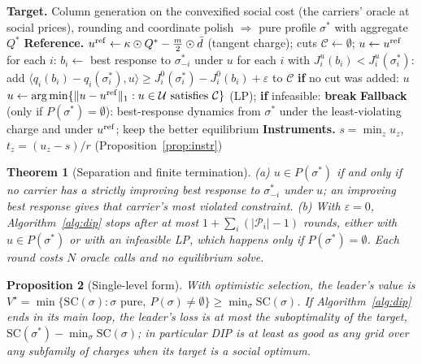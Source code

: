 \documentclass[preprint,12pt]{elsarticle}
\newtheorem{theorem}{Theorem}
\newtheorem{proposition}[theorem]{Proposition}
\theoremstyle{definition}
\theoremstyle{remark}
\newcommand{\ip}[2]{\langle #1,#2\rangle}
\begin{document}
\begin{algorithm}[t]
\caption{DIP: dual implementation pricing}\label{alg:dip}
\begin{algorithmic}[1]
\State \textbf{Target.} Column generation on the convexified social cost (the carriers' oracle at social prices), rounding and coordinate polish $\Rightarrow$ pure profile $\sigma^*$ with aggregate $Q^*$
\State \textbf{Reference.} $u^{\rm ref}\gets\kappa\odot Q^*-\tfrac m2\odot\bar d$ (tangent charge); cuts $\mathcal C\gets\emptyset$; $u\gets u^{\rm ref}$
\Repeat
  \State for each $i$: $b_i\gets$ best response to $\sigma^*_{-i}$ under $u$ 
  \State for each $i$ with $J^u_i(b_i)<J^u_i(\sigma^*_i)$: add $\ip{q_i(b_i)-q_i(\sigma^*_i)}{u}\ge J^0_i(\sigma^*_i)-J^0_i(b_i)+\varepsilon$ to $\mathcal C$
  \State \textbf{if} no cut was added: \Return $u$ 
  \State $u\gets\arg\min\{\|u-u^{\rm ref}\|_1:u\in\mathcal U\text{ satisfies }\mathcal C\}$ (LP); \textbf{if} infeasible: \textbf{break}
\Until{}
\State \textbf{Fallback} (only if $P(\sigma^*)=\emptyset$): best-response dynamics from $\sigma^*$ under the least-violating charge and under $u^{\rm ref}$; keep the better equilibrium
\State \textbf{Instruments.} $s=\min_zu_z$, $t_z=(u_z-s)/r$ (Proposition~\ref{prop:instr})
\end{algorithmic}
\end{algorithm}

\begin{theorem}[Separation and finite termination]\label{thm:cut}
(a) $u\in P(\sigma^*)$ if and only if no carrier has a strictly improving best response to $\sigma^*_{-i}$ under $u$; an improving best response gives that carrier's most violated constraint. (b) With $\varepsilon=0$, Algorithm~\ref{alg:dip} stops after at most $1+\sum_i(|\mathcal P_i|-1)$ rounds, either with $u\in P(\sigma^*)$ or with an infeasible LP, which happens only if $P(\sigma^*)=\emptyset$. Each round costs $N$ oracle calls and no equilibrium solve.
\end{theorem}

\begin{proposition}[Single-level form]\label{prop:opt}
With optimistic selection, the leader's value is $V^\star=\min\{\mathrm{SC}(\sigma):\sigma\text{ pure},\ P(\sigma)\ne\emptyset\}\ge\min_\sigma\mathrm{SC}(\sigma)$. If Algorithm~\ref{alg:dip} ends in its main loop, the leader's loss is at most the suboptimality of the target, $\mathrm{SC}(\sigma^*)-\min_\sigma\mathrm{SC}(\sigma)$; in particular DIP is at least as good as any grid over any subfamily of charges when its target is a social optimum.
\end{proposition}
\end{document}

